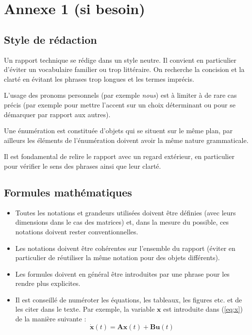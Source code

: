 \chapter*{Annexe 1 (si besoin)}

\makeatletter
\renewcommand{\thesection}{\@arabic\c@section}
\makeatother

\setcounter{section}{0}

\section*{Style de rédaction}
Un rapport technique se rédige dans un style neutre. Il convient en particulier d’éviter un vocabulaire familier ou trop littéraire. On recherche la concision et la clarté en évitant les phrases trop longues et les termes imprécis.

L’usage des pronoms personnels (par exemple \textit{nous}) est à limiter à de rare cas précis (par exemple pour mettre l’accent sur un choix déterminant ou pour se démarquer par rapport aux autres).

Une énumération est constituée d’objets qui se situent sur le même plan, par ailleurs les éléments de l’énumération doivent avoir la même nature grammaticale.

Il est fondamental de relire le rapport avec un regard extérieur, en particulier pour vérifier le sens des phrases ainsi que leur clarté.


\section*{Formules mathématiques}
\begin{itemize}
	\item Toutes les notations et grandeurs utilisées doivent être définies (avec leurs dimensions dans le cas des matrices) et, dans la mesure du possible, ces notations doivent rester conventionnelles.
	\item Les notations doivent être cohérentes sur l’ensemble du rapport (éviter en particulier de réutiliser la même notation pour des objets différents).
	\item Les formules doivent en général être introduites par une phrase pour les rendre plus explicites.
	\item Il est conseillé de numéroter les équations, les tableaux, les figures etc. et de les citer dans le texte. Par exemple, la variable $\textbf{x}$ est introduite dans (\ref{eq:x}) de la manière suivante : 
	\begin{equation}
	\label{eq:x}
	\dot{\textbf{x}}(t) = \textbf{A} \textbf{x}(t) +\textbf{B} \textbf{u}(t)
	\end{equation}
\end{itemize}

